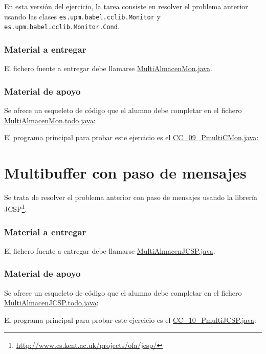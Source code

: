 \documentclass{article}
\begin{document}

En esta versión del ejercicio, la tarea consiste en resolver
el problema anterior usando las clases
\lstinline{es.upm.babel.cclib.Monitor} y
\lstinline{es.upm.babel.cclib.Monitor.Cond}.

\subsubsection*{Material a entregar}
El fichero fuente a entregar debe llamarse \url{MultiAlmacenMon.java}.

\subsubsection*{Material de apoyo}%
Se ofrece un esqueleto de código que el alumno debe completar en el fichero
\url{MultiAlmacenMon.todo.java}:


El programa principal para probar este ejercicio es el
\url{CC_09_PmultiCMon.java}: 


\clearpage
\section{Multibuffer con paso de mensajes}
Se trata de resolver el problema anterior con paso de mensajes usando
la librería
JCSP\footnote{\url{http://www.cs.kent.ac.uk/projects/ofa/jcsp/}}.

\subsubsection*{Material a entregar}
El fichero fuente a entregar debe llamarse \url{MultiAlmacenJCSP.java}.

\subsubsection*{Material de apoyo}%
Se ofrece un esqueleto de código que el alumno debe completar en el fichero
\url{MultiAlmacenJCSP.todo.java}:


El programa principal para probar este ejercicio es el
\url{CC_10_PmultiJCSP.java}: 

\end{document}
